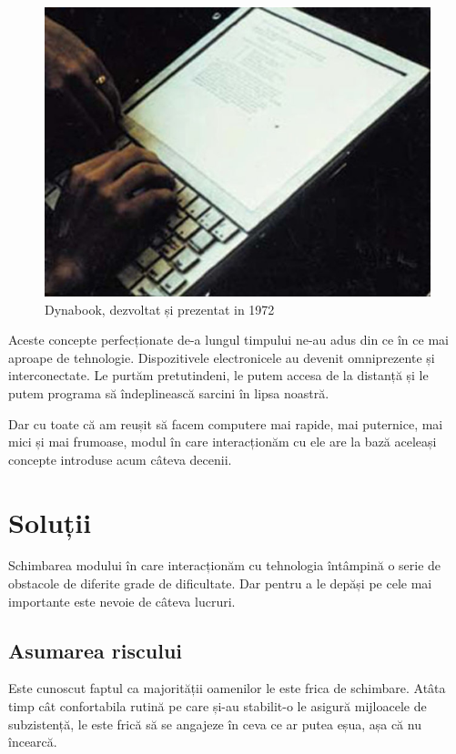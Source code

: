 \begin{figure}[h]
  \centering
  \includegraphics[scale=0.6]{img/dynabook.jpg}
  \caption{Dynabook, dezvoltat și prezentat in 1972}
\end{figure}
\newpage

Aceste concepte perfecționate de-a lungul timpului ne-au adus din ce în ce mai aproape de tehnologie. Dispozitivele electronicele au devenit omniprezente și interconectate. Le purtăm pretutindeni, le putem accesa de la distanță și le putem programa să îndeplinească sarcini în lipsa noastră.

Dar cu toate că am reușit să facem computere mai rapide, mai puternice, mai mici și mai frumoase, modul în care interacționăm cu ele are la bază aceleași concepte introduse acum câteva decenii.

\section{Soluții}

Schimbarea modului în care interacționăm cu tehnologia întâmpină o serie de obstacole de diferite grade de dificultate. Dar pentru a le depăși pe cele mai importante este nevoie de câteva lucruri.

\subsection{Asumarea riscului}

Este cunoscut faptul ca majorității oamenilor le este frica de schimbare. Atâta timp cât confortabila rutină pe care și-au stabilit-o le asigură mijloacele de subzistență, le este frică să se angajeze în ceva ce ar putea eșua, așa că nu încearcă.

